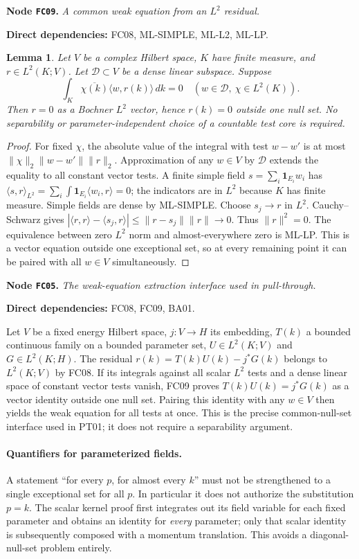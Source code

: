 \documentclass[11pt,a4paper]{article}
\newtheorem{lemma}[theorem]{Lemma}
\theoremstyle{remark}\newtheorem{remark}[theorem]{Remark}
\newcommand{\node}[3]{\par\Needspace{6\baselineskip}\smallskip\hypertarget{node:#1}{}\label{nodepage:#1}\noindent\textbf{Node \texttt{#1}.} \textit{#2.}\par\noindent\textbf{Direct dependencies:} #3.\par}
\begin{document}
\node{FC09}{A common weak equation from an $L^2$ residual}{FC08, ML-SIMPLE, ML-L2, ML-LP}
\begin{lemma}\label{lem:residualzero}
Let $V$ be a complex Hilbert space, $K$ have finite measure, and $r\in L^2(K;V)$. Let $\mathscr D\subset V$ be a dense linear subspace. Suppose
\[
 \int_K\overline{\chi(k)}\langle w,r(k)\rangle\,dk=0
 \quad(w\in\mathscr D,\ \chi\in L^2(K)).
\]
Then $r=0$ as a Bochner $L^2$ vector, hence $r(k)=0$ outside one null set. No separability or parameter-independent choice of a countable test core is required.
\end{lemma}
\begin{proof}
For fixed $\chi$, the absolute value of the integral with test $w-w'$ is at most $\|\chi\|_2\|w-w'\|\|r\|_2$. Approximation of any $w\in V$ by $\mathscr D$ extends the equality to all constant vector tests. A finite simple field $s=\sum_i\mathbf1_{E_i}w_i$ has
$\langle s,r\rangle_{L^2}=\sum_i\int\mathbf1_{E_i}\langle w_i,r\rangle=0$; the indicators are in $L^2$ because $K$ has finite measure. Simple fields are dense by ML-SIMPLE. Choose $s_j\to r$ in $L^2$. Cauchy--Schwarz gives
$|\langle r,r\rangle-\langle s_j,r\rangle|\leq\|r-s_j\|\|r\|\to0$.
Thus $\|r\|^2=0$. The equivalence between zero $L^2$ norm and almost-everywhere zero is ML-LP. This is a vector equation outside one exceptional set, so at every remaining point it can be paired with all $w\in V$ simultaneously.
\end{proof}

\node{FC05}{The weak-equation extraction interface used in pull-through}{FC08, FC09, BA01}
Let $V$ be a fixed energy Hilbert space, $j:V\to H$ its embedding, $T(k)$ a bounded continuous family on a bounded parameter set, $U\in L^2(K;V)$ and $G\in L^2(K;H)$. The residual $r(k)=T(k)U(k)-j^*G(k)$ belongs to $L^2(K;V)$ by FC08. If its integrals against all scalar $L^2$ tests and a dense linear space of constant vector tests vanish, FC09 proves $T(k)U(k)=j^*G(k)$ as a vector identity outside one null set. Pairing this identity with any $w\in V$ then yields the weak equation for all tests at once. This is the precise common-null-set interface used in PT01; it does not require a separability argument.\label{lem:localweakextraction}


\paragraph{Quantifiers for parameterized fields.}
A statement ``for every $p$, for almost every $k$'' must not be strengthened to a single exceptional set for all $p$. In particular it does not authorize the substitution $p=k$. The scalar kernel proof first integrates out its field variable for each fixed parameter and obtains an identity for \emph{every} parameter; only that scalar identity is subsequently composed with a momentum translation. This avoids a diagonal-null-set problem entirely.
\end{document}
